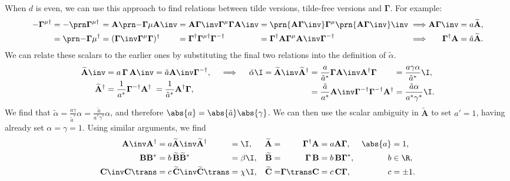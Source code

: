 \documentclass[11pt]{article}
\newcommand{\invd}{^{-\dag}}
\newcommand{\cc}{^\ast}
\newcommand{\hc}{^\dag}
\newcommand{\Gammab}{\boldsymbol{\Gamma}}
\newcommand{\mud}{^{\mu\dag}}
\newcommand{\A}{\mathbf{A}}
\newcommand{\B}{\mathbf{B}}
\renewcommand{\C}{\mathbf{C}}
\newcommand{\At}{\widetilde{\A}}
\newcommand{\Bt}{\widetilde{\B}}
\newcommand{\Ct}{\widetilde{\C}}
\newcommand{\alphat}{\tilde{\alpha}}
\begin{document}
When \(d\) is even, we can use this approach to find relations between tilde versions, tilde-free versions and \(\Gammab\).
For example:
%
\begin{equation*}
\begin{alignedat}{6}
  -\Gammab\mud 
    &= -\Gammap[\mud] &
    &= \A \Gammap*[\mu] \A\inv &
    &= \A \Gammab\inv \Gammab^\mu \Gammab \A\inv &
    &= \prn{\A \Gammab\inv} \Gammab^\mu \prn{\A \Gammab\inv}\inv &
    &\implies &
  \A \Gammab\inv &= a \At, \\
    &= \Gammap*[\mu]\hc &
    &= (\Gammab\inv \Gammab^\mu \Gammab)\hc &
    &= \Gammab\hc \Gammab\mud \Gammab\invd &
    &= \Gammab\hc \A \Gammab^\mu \A\inv \Gammab\invd &
    &\implies &
  \Gammab\hc \A &= \tilde{a} \At. \\
\end{alignedat}
\end{equation*}
%
We can relate these scalars to the earlier ones by substituting the final two relations into the definition of \(\alphat\).
%
\begin{equation*}
\begin{alignedat}[t]{2}
  \At\inv &= a \, \Gammab \, \A\inv &
    &= \tilde{a} \A\inv \Gammab\invd, \\
  \At\hc &= \frac{1}{a\cc} \Gammab\invd \A\hc &
    &= \frac{1}{\tilde{a}\cc} \A\hc \Gammab,
\end{alignedat}
   \quad\implies\quad
\begin{alignedat}[t]{3}
  \alphat \I &= \At\inv \At\hc &
    &= \frac{a}{\tilde{a}\cc} \Gammab \A\inv \A\hc \Gammab &
      &= \frac{a \gamma \alpha}{\tilde{a}\cc} \I, 
    \\ &&
    &= \frac{\tilde{a}}{a\cc} \A\inv \Gammab\invd \Gammab\invd \A\hc &
      &= \frac{\tilde{a} \alpha}{a\cc \gamma\cc} \I.
\end{alignedat}
\end{equation*}
%
We find that \( \alphat = \frac{a \gamma}{\tilde{a}\cc} \alpha = \frac{\tilde{a}}{a\cc \gamma\cc} \alpha \),
and therefore \( \abs{a} = \abs{\tilde{a}} \abs{\gamma} \).
We can then use the scalar ambiguity in \(\At\) to set \(a' = 1\), having already set \(\alpha = \gamma = 1\).
Using similar arguments, we find
%
\begin{equation}\label{eq:chiraltilde}
\begin{alignedat}{5}
  \A\inv \A\hc &= a \At\inv \At\hc &&= \I,               &\quad
  \At &= &\Gammab\hc \A &= a \A \Gammab,                 &\quad
  \abs{a} &= 1,                                          \\
  \B \B\cc &= b \, \Bt \Bt\cc &&= \beta \I,              &
  \Bt &= &\Gammab \, \B &= b \, \B \Gammab\cc,           &
  b &\in \R,                                             \\
  \C\inv \C\trans &= c \, \Ct\inv \Ct\trans &&= \chi \I, &
  \Ct &= &\Gammab\trans \C &= c \, \C \Gammab,           &
  c &= \pm 1.
\end{alignedat}
\end{equation}
\end{document}
